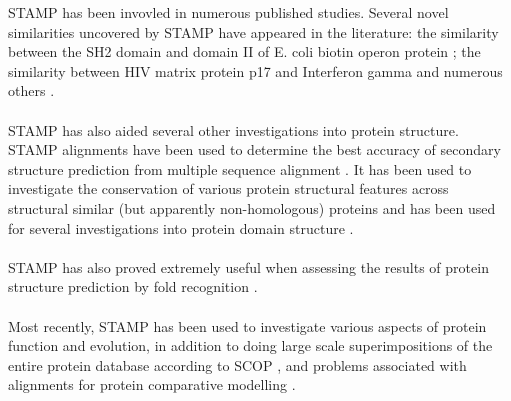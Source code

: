STAMP has been invovled in numerous published studies.  
Several novel similarities uncovered by STAMP have appeared 
in the literature: the similarity between the SH2 domain 
and domain II of E. coli biotin operon protein \cite{rb93b}; the 
similarity between HIV matrix protein p17 and Interferon 
gamma \cite{matthews94} and numerous others \cite{russell94,russell96,russell97a}.\\
\\
STAMP has also aided several other investigations 
into protein structure.  STAMP alignments have been used to 
determine the best accuracy of secondary structure prediction 
from multiple sequence alignment \cite{rb93c}. It has been used to 
investigate the conservation of various protein structural features 
across  structural similar (but apparently non-homologous) proteins 
\cite{rb94,russell97b} and has been used for several investigations into protein domain 
structure \cite{russell94,sternberg95,siddiqui95}.\\
\\
STAMP has also proved extremely useful when assessing the results of
protein structure prediction by fold recognition 
\cite{rcb95a,rcb96,russell98b}.\\
\\
Most recently, STAMP has been used to investigate various aspects of protein function 
and evolution, in addition to doing large scale superimpositions of the entire
protein database according to SCOP \cite{russell97b,russell98a}, and problems
associated with alignments for protein comparative modelling 
\cite{saqi98}.

\nocite{TitlesOn}




